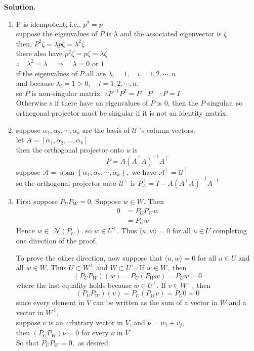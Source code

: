 \documentclass[english,onecolumn]{IEEEtran}
\begin{document}
\noindent
\textbf{Solution.}
\begin{enumerate}
\item P is idempotent; i.e., $p^{2}=p$ \\
suppose the eigenvalues of $P$ is $\lambda$ and the associated eigenvector is $\zeta$ \\
then, $P^{2}\zeta=\lambda p \zeta =\lambda^{2}\zeta$\\
there also have $p^{2}\zeta =p \zeta =\lambda\zeta$\\
$\therefore \quad \lambda^{2}=\lambda \quad \Rightarrow \quad \lambda=0 $ or $ 1$\\
if the eigenvalues of $P$ all are $\lambda_{i}=1, \quad i=1,2, \cdots, n$\\
and because $\lambda_{i}=1>0, \quad i=1,2, \cdots, n,$\\
so $P$ is non-singular
matrix. 
$\therefore P^{-1} P^{2}=P^{-1} P \quad \therefore P=I$\\
Otherwise s if there have an eigenvalues of $P$ is 0, then the $P$ singular.
so orthogonal projector must be singular if it is not an identity matrix.


\item
suppose $\alpha_{1}, \alpha_{2}, \cdots, \alpha_{k}$ are the basis of $\mathcal U$ 's column vectors,\\
let $A=\left[\alpha_{1}, \alpha_{2}, \ldots, \alpha_{k}\right]$\\
then the orthogonal projector onto $u$ is
$$
P=A\left(A^{\top} A\right)^{-1} A^{\top}
$$
suppose $\mathcal A=\operatorname{span}\left\{\alpha_{1}, \alpha_{2}, \cdots, \alpha_{k}\right\},$ we have $\mathcal A^{\top}=\mathcal U^{\top}$\\
so the orthogonal projector onto $\mathcal U^{\perp}$ is
$P_{A}^{\perp}=I-A\left(A^{\top} A\right)^{-1} A^{-1}$


\item 
First suppose $P_{U} P_{W}=0 .$ Suppose $w \in W .$ Then
$$
\begin{aligned}
0 &=P_{U} P_{W} w \\
&=P_{U} w
\end{aligned}
$$
Hence $w \in$ $\mathcal N(P_{U})$. so $w \in U^{\perp} .$ Thus $\langle u, w\rangle=0$ for all $u \in U$ completing one direction of the proof.

To prove the other direction, now suppose that $\langle u, w\rangle=0$ for all $u \in U$ and all $w \in W .$ Thus $U \subset W^{\perp}$ and $W \subset U^{\perp} .$ If $w \in W,$ then
$$
\left(P_{U} P_{W}\right)(w)=P_{U}\left(P_{W} w\right)=P_{U} w=0
$$
where the last equality holds because $w \in U^{\perp} .$ If $v \in W^{\perp},$ then
$$
\left(P_{U} P_{W}\right)(v)=P_{U}\left(P_{W} v\right)=P_{U} 0=0
$$
since every element in $V$ can be written as the sum of a vector in $W$ and a vector in $W^{\perp}$, \\
suppose $\nu$ is an arbitrary vector in $V$, and $\nu = w_i + v_j$, \\
then $\left(P_{U} P_{W}\right)\nu = 0$ for every $\nu$ in $V$
\\So that $P_{U} P_{W}=0,$ as desired.



\end{enumerate}
\end{document}
